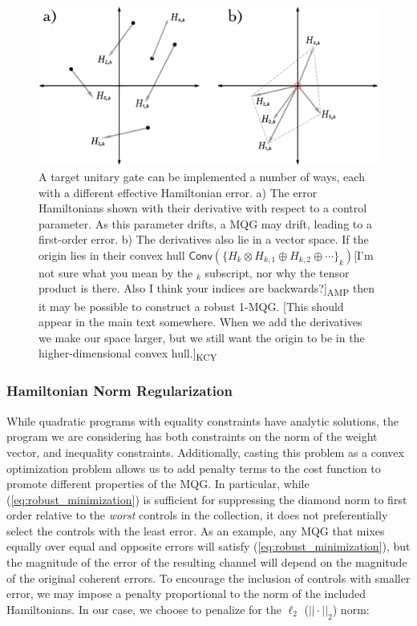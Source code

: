 \documentclass[aps,nofootinbib,pra,notitlepage,twocolumn]{revtex4-1}
\newcommand{\kcy}[1]{{\color{red}[#1]\textsubscript{\rm{KCY}}}}
\newcommand{\amp}[1]{{\color{red}[#1]\textsubscript{\rm{AMP}}}}
\begin{document}
\begin{figure}
  \centering
  \includegraphics[width=\columnwidth]{vectorspace2.pdf}
  \caption{A target unitary gate can be implemented a number of ways, each with a different effective Hamiltonian error. a) The error Hamiltonians shown with their derivative with respect to a control parameter. As this parameter drifts, a MQG may drift, leading to a first-order error. b) The derivatives also lie in a vector space. If the origin lies in their convex hull $\mathsf{Conv}(\{H_k \otimes H_{k,1} \oplus H_{k,2} \oplus \cdots\}_k)$\amp{I'm not sure what you mean by the $_k$ subscript, nor why the tensor product is there. Also I think your indices are backwards?} then it may be possible to construct a robust 1-MQG. \kcy{This should appear in the main text somewhere. When we add the derivatives we make our space larger, but we still want the origin to be in the higher-dimensional convex hull.}}
  \label{fig:vectorspace}
\end{figure}



\subsubsection{Hamiltonian Norm Regularization}
\label{sec:norm}
While quadratic programs with equality constraints have analytic solutions, the program we are considering has both constraints on the norm of the weight vector, and inequality constraints. Additionally, casting this problem as a convex optimization problem allows us to add penalty terms to the cost function to promote different properties of the MQG. In particular, while (\ref{eq:robust_minimization}) is sufficient for suppressing the diamond norm to first order relative to the \textit{worst} controls in the collection, it does not preferentially select the controls with the least error. As an example, any MQG that mixes equally over equal and opposite errors will satisfy (\ref{eq:robust_minimization}), but the magnitude of the error of the resulting channel will depend on the magnitude of the original coherent errors. To encourage the inclusion of controls with smaller error, we may impose a penalty proportional to the norm of the included Hamiltonians. In our case, we choose to penalize for the $\ell_2$ ($||\cdot||_2$) norm:
\end{document}
